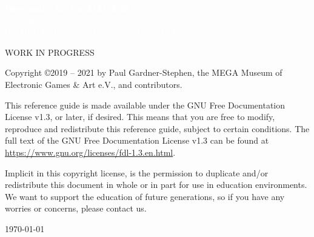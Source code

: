 





\cleardoublepage


  \begin{titlepage}
    \pagecolor{blue}
     \begin{center}
       {
         \large
         \vspace*{2cm}
               {\Huge\textcolor{white}{\bf{Developing for the MEGA65}}}\\
             \vspace{\fill}
                    {\textcolor{white}
                    {Published by \\ the MEGA Museum of Electronic Games \& Art e.V., Germany.}}
       }
     \end{center}
   \end{titlepage}

  \pagecolor{white}\textcolor{black}
  \vfill
  WORK IN PROGRESS

  Copyright \copyright 2019 -- 2021 by Paul Gardner-Stephen,
  the MEGA Museum of Electronic Games \& Art e.V.,
  and contributors.

  This reference guide is made available under the GNU Free Documentation
  License v1.3, or later, if desired. This means that you are free to
  modify, reproduce and redistribute this reference guide, subject to
  certain conditions. The full text of the GNU Free Documentation
  License v1.3 can be found at
  \url{https://www.gnu.org/licenses/fdl-1.3.en.html}.

  Implicit in this copyright license, is the permission to duplicate
  and/or redistribute this document in whole or in part for use in
  education environments. We want to support the education of future
  generations, so if you have any worries or concerns, please contact us.

   \par\today

